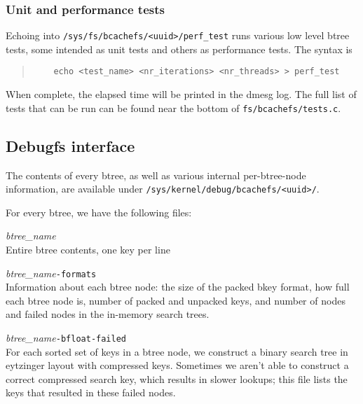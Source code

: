 \documentclass{article}
\begin{document}
\subsubsection{Unit and performance tests}

Echoing into \texttt{/sys/fs/bcachefs/<uuid>/perf\_test} runs various low level
btree tests, some intended as unit tests and others as performance tests. The
syntax is
\begin{quote} \begin{verbatim}
	echo <test_name> <nr_iterations> <nr_threads> > perf_test
\end{verbatim} \end{quote}

When complete, the elapsed time will be printed in the dmesg log. The full list
of tests that can be run can be found near the bottom of
\texttt{fs/bcachefs/tests.c}.

\subsection{Debugfs interface}

The contents of every btree, as well as various internal per-btree-node
information, are available under \texttt{/sys/kernel/debug/bcachefs/<uuid>/}.

For every btree, we have the following files:

\begin{description}
	\item \textit{btree\_name} \\
		Entire btree contents, one key per line

	\item \textit{btree\_name}\texttt{-formats} \\
		Information about each btree node: the size of the packed bkey
		format, how full each btree node is, number of packed and
		unpacked keys, and number of nodes and failed nodes in the
		in-memory search trees.

	\item \textit{btree\_name}\texttt{-bfloat-failed} \\
		For each sorted set of keys in a btree node, we construct a
		binary search tree in eytzinger layout with compressed keys.
		Sometimes we aren't able to construct a correct compressed
		search key, which results in slower lookups; this file lists the
		keys that resulted in these failed nodes.
\end{description}
\end{document}

